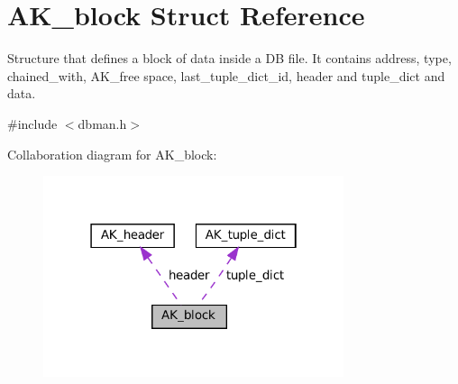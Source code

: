 \hypertarget{structAK__block}{}\section{A\+K\+\_\+block Struct Reference}
\label{structAK__block}


Structure that defines a block of data inside a DB file. It contains address, type, chained\+\_\+with, A\+K\+\_\+free space, last\+\_\+tuple\+\_\+dict\+\_\+id, header and tuple\+\_\+dict and data.  




{\ttfamily \#include $<$dbman.\+h$>$}



Collaboration diagram for A\+K\+\_\+block\+:\nopagebreak
\begin{figure}[H]
\begin{center}
\leavevmode
\includegraphics[width=250pt]{structAK__block__coll__graph}
\end{center}
\end{figure}
